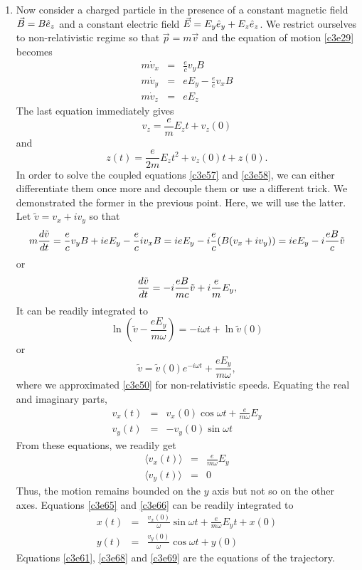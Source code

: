 \begin{enumerate}
\item Now consider a charged particle in the presence of a constant magnetic field
$\vec{B} = B\hat{e}_{z}$ and a constant electric field $\vec{E} = E_y\hat{e}_{y} + E_z\hat{e}_{z}$.
We restrict ourselves to non-relativistic regime so that $\vec{p} = m\vec{v}$ and
the equation of motion \eqref{c3e29} becomes
\begin{eqnarray}
m\dot{v}_x &=& \frac{e}{c}v_yB \label{c3e58} \\
m\dot{v}_y &=& eE_y - \frac{e}{c}v_xB \label{c3e59} \\
m\dot{v}_z &=& eE_z \label{c3e60}
\end{eqnarray}
The last equation immediately gives
\[
v_z = \frac{e}{m}E_zt + v_z(0)
\]
and
\begin{equation}\label{c3e61}
z(t) = \frac{e}{2m}E_zt^2 + v_z(0)t + z(0).
\end{equation}
In order to solve the coupled equations \eqref{c3e57} and \eqref{c3e58}, we can 
either differentiate them once more and decouple them or use a different trick.
We demonstrated the former in the previous point. Here, we will use the latter.
Let $\tilde{v} = v_x + iv_y$ so that
\[
m\frac{d{\tilde{v}}}{d{t}} = \frac{e}{c}v_yB + ieE_y - \frac{e}{c}{iv_xB}
= ieE_y -i\frac{e}{c}(B(v_x + iv_y)) = ieE_y - i\frac{eB}{c}\tilde{v}
\]
or
\begin{equation}\label{c3e62}
\frac{d{\tilde{v}}}{d{t}} = -i\frac{eB}{mc}\tilde{v} + i\frac{e}{m}E_y,
\end{equation}
It can be readily integrated to
\[
\ln\left(\tilde{v} - \frac{eE_y}{m\omega}\right) = -i\omega t + \ln\tilde{v}(0)
\]
or
\begin{equation}\label{c3e63}
\tilde{v} = \tilde{v}(0)e^{-i\omega t} + \frac{eE_y}{m\omega},
\end{equation}
where we approximated \eqref{c3e50} for non-relativistic speeds. Equating the
real and imaginary parts,
\begin{eqnarray}
v_x(t) &=& v_x(0)\cos\omega t  + \frac{e}{m\omega}E_y\label{c3e64} \\
v_y(t) &=& -v_y(0)\sin\omega t \label{c3e65}
\end{eqnarray}
From these equations, we readily get
\begin{eqnarray}
\langle v_x(t) \rangle &=& \frac{e}{m\omega}E_y \label{c3e66} \\
\langle v_y(t) \rangle &=& 0 \label{c3e67}
\end{eqnarray}
Thus, the motion remains bounded on the $y$ axis but not so on the other axes. 
Equations \eqref{c3e65} and \eqref{c3e66} can be readily integrated to
\begin{eqnarray}
x(t) &=& \frac{v_x(0)}{\omega}\sin\omega t + \frac{e}{m\omega}E_yt + x(0) \label{c3e68} \\
y(t) &=& \frac{v_y(0)}{\omega}\cos\omega t + y(0) \label{c3e69}
\end{eqnarray}
Equations \eqref{c3e61}, \eqref{c3e68} and \eqref{c3e69} are the equations of the
trajectory.


\end{enumerate}
